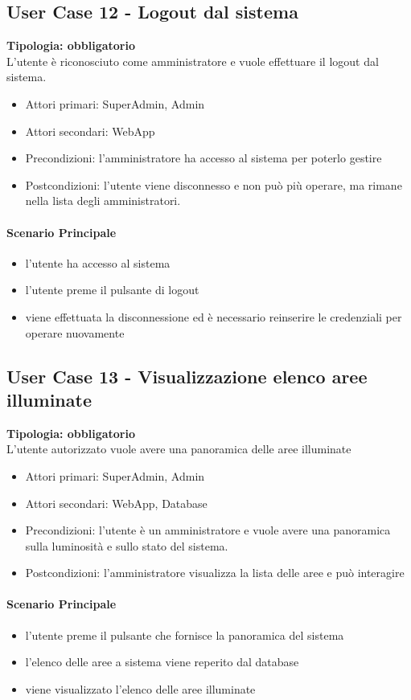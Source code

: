 \documentclass[12pt]{article}
\begin{document}
\subsection{User Case 12 - Logout dal sistema}
\textbf{Tipologia: obbligatorio} \\
L'utente è riconosciuto come amministratore e vuole effettuare il logout dal sistema.
\begin{itemize}
	\item Attori primari: SuperAdmin, Admin
	\item Attori secondari: WebApp
	\item Precondizioni: l'amministratore ha accesso al sistema per poterlo gestire
	\item Postcondizioni: l'utente viene disconnesso e non può più operare, ma rimane nella lista degli amministratori.
\end{itemize}
\paragraph{Scenario Principale}
\begin{itemize}
	\item l'utente ha accesso al sistema
	\item l'utente preme il pulsante di logout
	\item viene effettuata la disconnessione ed è necessario reinserire le credenziali per operare nuovamente
\end{itemize}

\subsection{User Case 13 - Visualizzazione elenco aree illuminate}
\textbf{Tipologia: obbligatorio} \\
L'utente autorizzato vuole avere una panoramica delle aree illuminate
\begin{itemize}
	\item Attori primari: SuperAdmin, Admin
	\item Attori secondari: WebApp, Database
	\item Precondizioni: l'utente è un amministratore e vuole avere una panoramica sulla luminosità e sullo stato del sistema.
	\item Postcondizioni: l'amministratore visualizza la lista delle aree e può interagire
\end{itemize}
\paragraph{Scenario Principale}
\begin{itemize}
	\item l'utente preme il pulsante che fornisce la panoramica del sistema
	\item l'elenco delle aree a sistema viene reperito dal database
	\item viene visualizzato l'elenco delle aree illuminate
\end{itemize}
\end{document}
